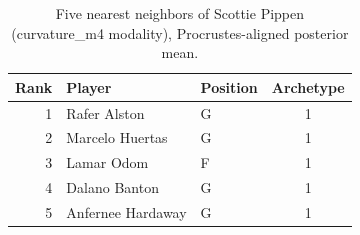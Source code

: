 \begin{table}[htbp]
  \centering\small
  \begin{tabular}{rllc}
    \toprule
    Rank & Player & Position & Archetype \\
    \midrule
    1 & Rafer Alston & G & 1 \\
    2 & Marcelo Huertas & G & 1 \\
    3 & Lamar Odom & F & 1 \\
    4 & Dalano Banton & G & 1 \\
    5 & Anfernee Hardaway & G & 1 \\
    \bottomrule
  \end{tabular}
  \caption{Five nearest neighbors of Scottie Pippen (curvature_m4 modality), Procrustes-aligned posterior mean.}
  \label{tab:Scottie_Pippen_neighbors_curvature_m4}
\end{table}

